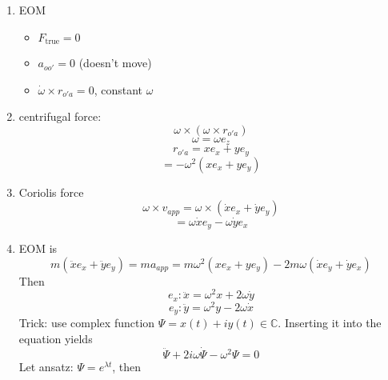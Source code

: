 \documentclass{article}
\newtheorem{one minute paper}[theorem]{One Minute Paper}
\begin{document}
\begin{enumerate}
    \item EOM 
    \begin{itemize}
        \item $F_{\text{true}} = 0$
        \item $a_{oo'} = 0$ (doesn't move)
        \item $\dot{\omega} \times r_{o'a} = 0$, constant $\omega$
    \end{itemize}
    \item centrifugal force: 
    \begin{equation}
        \omega \times (\omega \times r_{o'a})
    \end{equation}
    \begin{equation}
        \omega = \omega e_z
    \end{equation}
    \begin{equation}
        r_{o'a} = xe_{x} + ye_y
    \end{equation}
    \begin{equation}
        = -\omega^2(xe_x + ye_y)
    \end{equation}
    \item Coriolis force 
    \begin{equation}
        \omega \times v_{app} = \omega \times (\dot{x}e_{x} + \dot{y}e_y)
    \end{equation}
    \begin{equation}
        = \omega\dot{x}e_y - \omega\dot{y}e_x
    \end{equation}
    \item EOM is 
    \begin{equation}
        m(\ddot{x}e_x + \ddot{y}e_y) = ma_{app} = m\omega^2(xe_x + ye_y) - 2m\omega(\dot{x}e_y + \dot{y}e_x)
    \end{equation}
    Then 
    \begin{equation}
        e_x: \ddot{x} = \omega^2 x + 2\omega \dot{y}
    \end{equation}
    \begin{equation}
        e_y: \ddot{y} = \omega^2y - 2\omega \dot{x}
    \end{equation}
    Trick: use complex function $\Psi = x(t) + iy(t) \in \mathbb{C}$. Inserting it into the equation yields
    \begin{equation}
        \ddot{\Psi} + 2i\omega \dot{\Psi} - \omega^2 \Psi = 0
    \end{equation}
    Let ansatz: $\Psi = e^{\lambda t}$, then 
    \begin{equation}

\end{equation}
\end{enumerate}
\end{document}
